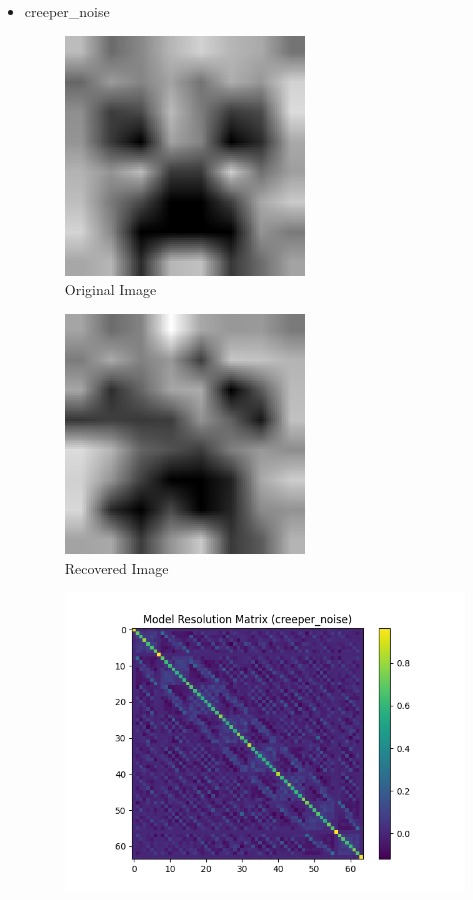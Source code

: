 \documentclass{article}
\begin{document}
\begin{itemize}
        \item creeper\_noise
    \begin{figure}[h]
        \centering
        \includegraphics[width=0.6\textwidth]{images/greyscale/creeper.png}
        \caption{Original Image}
    \end{figure}
    \begin{figure}[h]
        \centering
        \includegraphics[width=0.6\textwidth]{images/outputs/noise/creeper_noise.png}
        \caption{Recovered Image}
    \end{figure}
    \begin{figure}[h]
        \centering
        \includegraphics[width=1\textwidth]{images/outputs/modelres/creeper_noise.png}

\end{figure}
\end{itemize}
\end{document}
